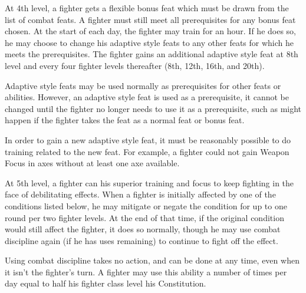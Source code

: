  At 4th level, a fighter gets a flexible bonus feat
which must be drawn from the list of combat feats. A fighter must still
meet all prerequisites for any bonus feat chosen. At the start of each day, the fighter may train for an hour. If he does so, he may choose to change his adaptive style feats to any other feats for which he meets the prerequisites.
The fighter gains an additional adaptive style feat at 8th level and every four fighter levels thereafter (8th, 12th, 16th, and 20th).
\par Adaptive style feats may be used normally as prerequisites for other feats or abilities.
However, an adaptive style feat is used as a prerequisite, it cannot be changed until the
fighter no longer needs to use it as a prerequisite, such as might happen if the fighter takes
the feat as a normal feat or bonus feat.
\par In order to gain a new adaptive style feat, it must be reasonably possible to do training related to the new feat. For example, a fighter could not gain Weapon Focus in axes without at least one axe available.

 At 5th level, a fighter can his superior training and focus to keep fighting in the face of debilitating effects. When a fighter is initially affected by one of the conditions listed below, he may mitigate or negate the condition for up to one round per two fighter levels. At the end of that time, if the original condition would still affect the fighter, it does so normally, though he may use combat discipline again (if he has uses remaining) to continue to fight off the effect.
\par Using combat discipline takes no action, and can be done at any time, even when it isn't the fighter's turn. A fighter may use this ability a number of times per day equal to half his fighter class level \add his Constitution.

